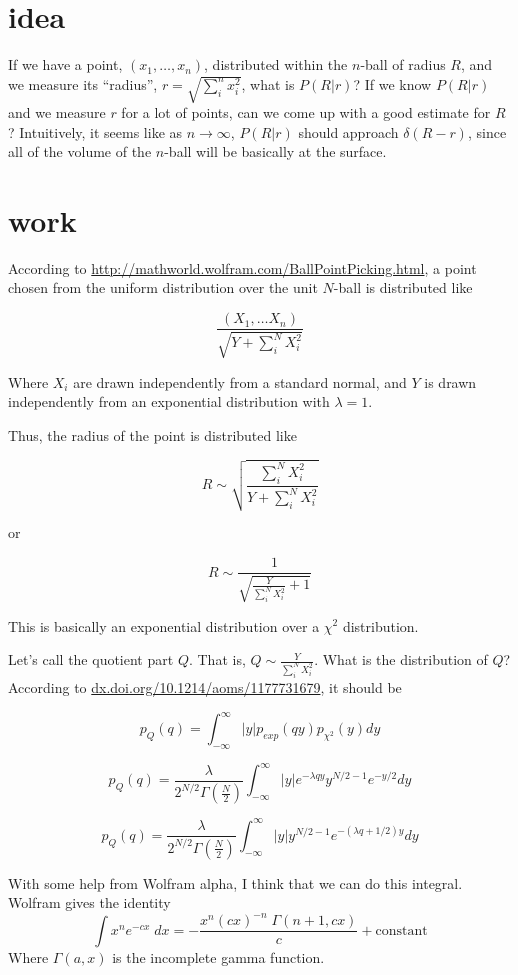 \documentclass{article}
\begin{document}
\section*{idea}    
If we have a point, $(x_1, \ldots, x_n)$, distributed within the $n$-ball of radius $R$, and we measure its ``radius'', $r = \sqrt{\sum_i^n x_i^2}$,
what is $P(R|r)$? If we know $P(R|r)$ and we measure $r$ for a lot of points,
can we come up with a good estimate for $R$? Intuitively, it seems like as $n\rightarrow\infty$, $P(R|r)$ should approach $\delta(R-r)$, since all of the
volume of the $n$-ball will be basically at the surface.

\section*{work}

According to \url{http://mathworld.wolfram.com/BallPointPicking.html}, a point
chosen from the uniform distribution over the unit $N$-ball is distributed like

$$
\frac{(X_1, \ldots X_n)}{\sqrt{Y + \sum_i^N X_i^2}}
$$

Where $X_i$ are drawn independently from a standard normal, and $Y$ is drawn independently from an exponential distribution with $\lambda=1$.

Thus, the radius of the point is distributed like

$$
R \sim \sqrt{\frac{\sum_i^N X_i^2}{Y  + \sum_i^N X_i^2}}
$$

or 

$$
R \sim \frac{1}{\sqrt{\frac{Y}{\sum_i^N X_i^2} + 1}}
$$

This is basically an exponential distribution over a $\chi^2$ distribution.

Let's call the quotient part $Q$. That is, $Q \sim \frac{Y}{\sum_i^N X_i^2}$. What is the distribution of $Q$? According to \url{dx.doi.org/10.1214/aoms/1177731679}, it should be

$$
p_Q(q) = \int_{-\infty}^\infty |y| p_{exp}(qy)p_{\chi^2}(y)dy
$$

$$
p_Q(q) = \frac{\lambda}{2^{N/2} \Gamma(\frac{N}{2})} \int_{-\infty}^\infty |y| e^{-\lambda qy} y^{N/2-1}e^{-y/2}dy
$$


$$
p_Q(q) = \frac{\lambda}{2^{N/2} \Gamma(\frac{N}{2})} \int_{-\infty}^\infty |y|  y^{N/2-1}e^{-(\lambda q + 1/2) y}dy
$$

With some help from Wolfram alpha, I think that we can do this integral. 
Wolfram gives the identity
$$
\int x^n e^{-cx} \; dx = -\frac{x^n (cx)^{-n} \; \Gamma(n + 1, cx)}{c} + \text{constant}
$$
Where $\Gamma(a, x)$ is the incomplete gamma function.
\end{document}
